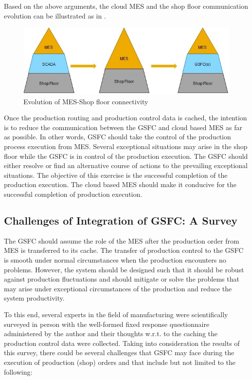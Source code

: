 \documentclass[10pt,conference,compsocconf]{IEEEtran}
\begin{document}
Based on the above arguments, the cloud MES and the shop floor communication evolution can be illustrated as in .
\begin{figure} [h]
\centering
\includegraphics [scale=0.5]{"Figures/MES-SF_Evolution"}
\caption{Evolution of MES-Shop floor connectivity}
\label{fig:MES-SF_Evolution}
\end{figure}
Once the production routing and production control data is cached, the intention is to reduce the communication between the GSFC and cloud based MES as far as possible. In other words, GSFC should take the control of the production process execution from MES. Several exceptional situations may arise in the shop floor while the GSFC is in control of the production execution. The GSFC should either resolve or find an alternative course of actions to the prevailing exceptional situations. The objective of this exercise is the successful completion of the production execution. The cloud based MES should make it conducive for the successful completion of production execution.
\subsection{Challenges of Integration of GSFC: A Survey} \label{GSFC_Challenges}
The GSFC should assume the role of the MES after the production order from MES is transferred to its cache. The transfer of production control to the GSFC is smooth under normal circumstances when the production encounters no problems. However, the system should be designed such that it should be robust against production fluctuations and should mitigate or solve the problems that may arise under exceptional circumstances of the production and reduce the system productivity. 

To this end, several experts in the field of manufacturing were scientifically surveyed in person with the well-formed fixed response questionnaire administered by the author and their thoughts w.r.t. to the caching the production control data were collected. Taking into consideration the results of this survey, there could be several challenges that GSFC may face during the execution of production (shop) orders and that include but not limited to the following:
 
\end{document}
